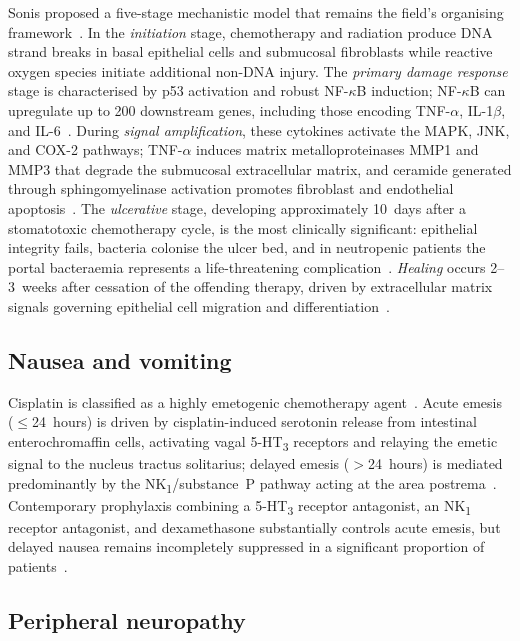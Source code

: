 \documentclass[preprint,review,12pt]{elsarticle}
\begin{document}
Sonis proposed a five-stage mechanistic model that remains the field's
organising framework~\cite{Sonis2004}. In the \emph{initiation} stage,
chemotherapy and radiation produce DNA strand breaks in basal epithelial cells
and submucosal fibroblasts while reactive oxygen species initiate additional
non-DNA injury. The \emph{primary damage response} stage is characterised by
p53 activation and robust NF-$\kappa$B induction; NF-$\kappa$B can upregulate
up to 200 downstream genes, including those encoding TNF-$\alpha$,
IL-1$\beta$, and IL-6~\cite{Sonis2004}. During \emph{signal amplification},
these cytokines activate the MAPK, JNK, and COX-2 pathways; TNF-$\alpha$
induces matrix metalloproteinases MMP1 and MMP3 that degrade the submucosal
extracellular matrix, and ceramide generated through sphingomyelinase activation
promotes fibroblast and endothelial apoptosis~\cite{Sonis2004}. The
\emph{ulcerative} stage, developing approximately 10~days after a stomatotoxic
chemotherapy cycle, is the most clinically significant: epithelial integrity
fails, bacteria colonise the ulcer bed, and in neutropenic patients the portal
bacteraemia represents a life-threatening complication~\cite{Sonis2004}.
\emph{Healing} occurs 2--3~weeks after cessation of the offending therapy,
driven by extracellular matrix signals governing epithelial cell migration and
differentiation~\cite{Sonis2004}.

\subsection{Nausea and vomiting}

Cisplatin is classified as a highly emetogenic chemotherapy agent~\cite{Basch2011}.
Acute emesis ($\leq$24~hours) is driven by cisplatin-induced serotonin release
from intestinal enterochromaffin cells, activating vagal 5-HT\textsubscript{3}
receptors and relaying the emetic signal to the nucleus tractus solitarius;
delayed emesis ($>$24~hours) is mediated predominantly by the
NK\textsubscript{1}/substance~P pathway acting at the area
postrema~\cite{Basch2011}. Contemporary prophylaxis combining a
5-HT\textsubscript{3} receptor antagonist, an NK\textsubscript{1} receptor
antagonist, and dexamethasone substantially controls acute emesis, but delayed
nausea remains incompletely suppressed in a significant proportion of
patients~\cite{Basch2011, Aapro2016}.

\subsection{Peripheral neuropathy}
\end{document}
